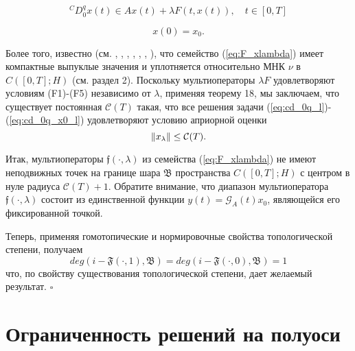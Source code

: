 \begin{equation}
    \label{eq:cd_0q_l}
    {}^CD_{0}^{q}x(t) \in Ax(t) + \lambda F(t, x(t)), \quad t \in [0, T]
\end{equation}

\begin{equation}
    \label{eq:cd_0q_x0_l}
    x(0) = x_0.
\end{equation}

Более того, известно (см. \cite{afanasova_rm}, \cite{benedetti}, \cite{kamenskii_fpt}, \cite{kamenskii_aa}, \cite{kamenskii_fpta17},
\cite{kamenskii_fpta19}, \cite{kamenskii_m}), что семейство (\ref{eq:F_xlambda}) имеет компактные выпуклые значения и уплотняется относительно
МНК $\nu$ в $C([0, T]; H)$ (см. раздел 2). Поскольку мультиоператоры $\lambda F$ удовлетворяют условиям (F1)-(F5) независимо от $\lambda$,
применяя теорему 18, мы заключаем, что существует постоянная $\mathcal{C}(T)$ такая, что все решения задачи
(\ref{eq:cd_0q_l})-(\ref{eq:cd_0q_x0_l}) удовлетворяют условию априорной оценки
$$\lVert x_{\lambda}\rVert \leq \mathcal{C}(T).$$

\noindent Итак, мультиоператоры $\mathfrak{f}(\cdot, \lambda)$ из семейства (\ref{eq:F_xlambda}) не имеют неподвижных точек на границе шара
$\mathfrak{B}$ пространства $C([0, T]; H)$ с центром в нуле радиуса $\mathcal{C}(T) + 1$. Обратите внимание, что диапазон мультиоператора
$\mathfrak{f}(\cdot, \lambda)$ состоит из единственной функции $y(t) = \mathcal{G}_A(t)x_0$, являющейся его фиксированной точкой.

Теперь, применяя гомотопические и нормировочные свойства топологической степени, получаем
$$deg(i - \mathfrak{F}(\cdot, 1), \mathfrak{B}) = deg(i - \mathfrak{F}(\cdot, 0), \mathfrak{B}) = 1$$
что, по свойству существования топологической степени, дает желаемый результат.
$\square$

\section{Ограниченность решений на полуоси}

\clearpage


\nocite{*}

\printbibliography{}

